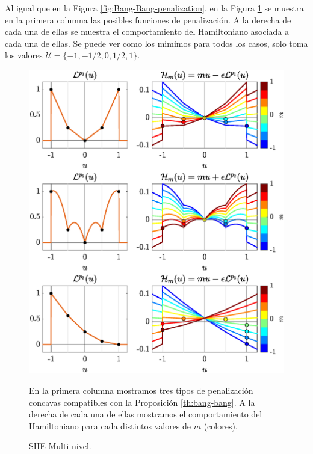 Al igual que en la Figura \ref{fig:Bang-Bang-penalization}, en la Figura \ref{fig:SHE-multi} se muestra en la primera columna las posibles funciones de penalización. A la derecha de cada una de ellas se muestra el comportamiento del Hamiltoniano asociada a cada una de ellas. Se puede ver como los mimimos para todos los casos, solo toma los valores $\mathcal{U} = \{-1,-1/2,0,1/2,1\}$.
\begin{figure}
    \includegraphics[scale=0.415]{img/fig04.eps}
    \caption{SHE Multi-nivel.} \footnotesize En la primera columna mostramos tres tipos de penalización concavas compatibles con la Proposición \ref{th:bang-bang}. A la derecha de cada una de ellas mostramos el comportamiento del Hamiltoniano para cada distintos valores de $m$ (colores). 
    \label{fig:SHE-multi}
\end{figure} 